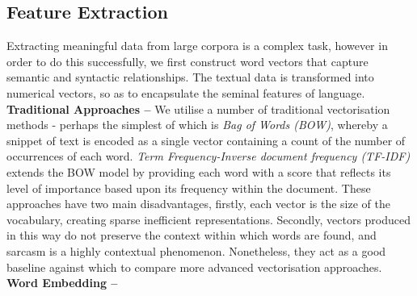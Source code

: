 \documentclass[12pt,a4paper]{article}
\begin{document}

\subsection{Feature Extraction}
\noindent Extracting meaningful data from large corpora is a complex task, however in order to do this successfully, we first construct word vectors that capture semantic and syntactic relationships. The textual data is transformed into numerical vectors, so as to encapsulate the seminal features of language.\\

\noindent \textbf{Traditional Approaches --} We utilise a number of traditional vectorisation methods - perhaps the simplest of which is \textit{Bag of Words (BOW)}, whereby a snippet of text is encoded as a single vector containing a count of the number of occurrences of each word. \textit{Term Frequency-Inverse document frequency (TF-IDF)} \cite{robertson1976relevance} extends the BOW model by providing each word with a score that reflects its level of importance based upon its frequency within the document. These approaches have two main disadvantages, firstly, each vector is the size of the vocabulary, creating sparse inefficient representations. Secondly, vectors produced in this way do not preserve the context within which words are found, and sarcasm is a highly contextual phenomenon. Nonetheless, they act as a good baseline against which to compare more advanced vectorisation approaches.\\

\noindent \textbf{Word Embedding --}
\end{document}
